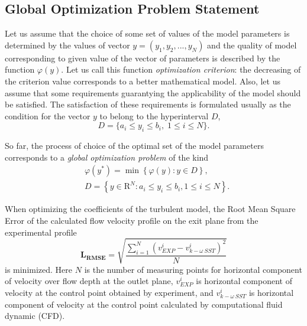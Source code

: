 \documentclass[applsci,article,submit,moreauthors,pdftex]{Definitions/mdpi}
\begin{document}








\subsection{Global Optimization Problem Statement}
Let us assume that the choice of some set of values of the model parameters is determined by the values of vector $y=(y_1,y_2,...,y_N)$ and the quality of model corresponding to given value of the vector of parameters is described by the function $\varphi(y)$. Let us call this function \textit{optimization criterion}: the decreasing of the criterion value corresponds to a better mathematical model. Also, let us assume that some requirements guarantying the applicability of the model should be satisfied. The satisfaction of these requirements is formulated usually as the condition for the vector $y$ to belong to the hyperinterval $D$,
\[
D=\{a_i \leq y_i \leq b_i, \; 1 \leq i \leq N\}.
\]

So far, the process of choice of the optimal set of the model parameters corresponds to a \textit{global optimization problem} of the kind
\begin{eqnarray}\label{main_problem}
& \varphi(y^\ast)=\min{\left\{\varphi(y):y\in D\right\}},\\
& D=\left\{y\in \text{R}^N: a_i\leq y_i \leq b_i, 1\leq i \leq N\right\}. \nonumber
\end{eqnarray}

When optimizing the coefficients of the turbulent model, the Root Mean Square Error of the calculated flow velocity profile on the exit plane from the experimental profile 
\begin{equation}
	\label{LossFunction}
	\boldsymbol{L_{RMSE}} = \sqrt{\frac{\sum\limits_{i=1}^{N} \left( v_{EXP}^i - v_{k-\omega\ SST}^i \right)^2}{N}}
\end{equation}
is minimized. 
Here $N$ is the number of measuring points for horizontal component of velocity over flow depth at the outlet plane, $v_{EXP}^i$ is horizontal component of velocity at the control point obtained by experiment, and $v_{k-\omega\ SST}^i$  is horizontal component of velocity at the control point calculated by computational fluid dynamic (CFD). 
\end{document}

